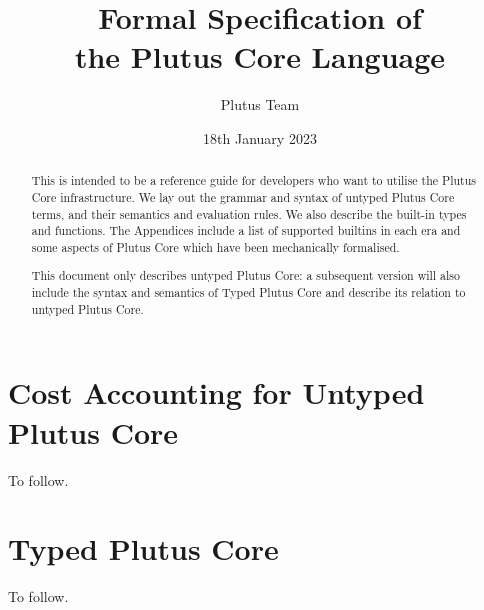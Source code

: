 \documentclass[a4paper]{article}
\title{Formal Specification of\\the Plutus Core Language}
\date{18th January 2023}
\author{Plutus Team}
\begin{document}
\maketitle

\begin{center}
  \LARGE{}
\end{center}

\begin{abstract}
  This is intended to be a reference guide for developers who want to utilise
  the Plutus Core infrastructure.  We lay out the grammar and syntax of untyped
  Plutus Core terms, and their semantics and evaluation rules.  We also describe
  the built-in types and functions.  The Appendices include a list of supported
  builtins in each era and some aspects of Plutus Core which have been
  mechanically formalised.
  
  This document only describes untyped Plutus Core: a subsequent version will also
  include the syntax and semantics of Typed Plutus Core and describe its relation to
  untyped Plutus Core.
\end{abstract}

\newpage
\tableofcontents
\newpage







\section{Cost Accounting for Untyped Plutus Core}
To follow.
\section{Typed Plutus Core}
To follow.

\begin{appendices}






\end{appendices}

\newpage


\newpage
\printnomenclature[2cm]  %
\end{document}
